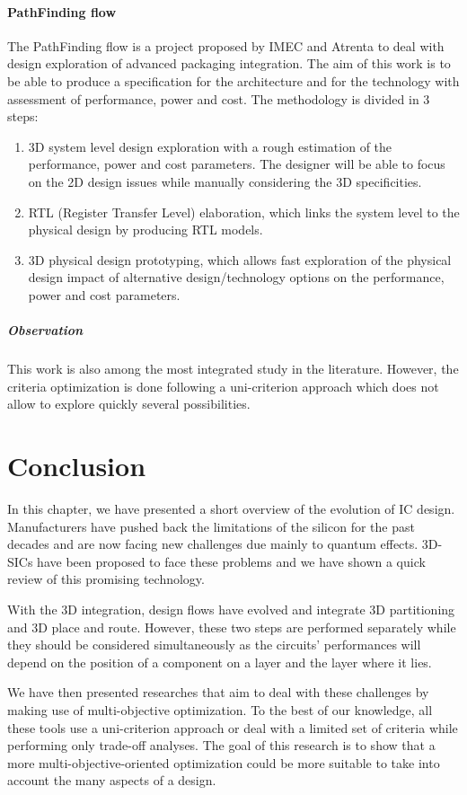 \paragraph{PathFinding flow}
The PathFinding flow is a project proposed by IMEC and Atrenta \cite{5335663,DBLP:conf/3dic/MilojevicCCRRSAPM09} to deal with design exploration of advanced packaging integration. The aim of this work is to be able to produce a specification for the architecture and for the technology with assessment of performance, power and cost. The methodology is divided in 3 steps:
\begin{enumerate}
\item 3D system level design exploration with a rough estimation of the performance, power and cost parameters. The designer will be able to focus on the 2D design issues while manually considering the 3D specificities.
\item RTL (Register Transfer Level) elaboration, which links the system level to the physical design by producing RTL models.
\item 3D physical design prototyping, which allows fast exploration of the physical design impact of alternative design/technology options on the performance, power and cost parameters.
\end{enumerate}

\subparagraph{Observation}
This work is also among the most integrated study in the literature. However, the criteria optimization is done following a uni-criterion approach which does not allow to explore quickly several possibilities.

\section{Conclusion}
In this chapter, we have presented a short overview of the evolution of IC design. Manufacturers have pushed back the limitations of the silicon for the past decades and are now facing new challenges due mainly to quantum effects. 3D-SICs have been proposed to face these problems and we have shown a quick review of this promising technology.

With the 3D integration, design flows have evolved and integrate 3D partitioning and 3D place and route. However, these two steps are performed separately while they should be considered simultaneously as the circuits' performances will depend on the position of a component on a layer and the layer where it lies.

We have then presented researches that aim to deal with these challenges by making use of multi-objective optimization. To the best of our knowledge, all these tools use a uni-criterion approach or deal with a limited set of criteria while performing only trade-off analyses. The goal of this research is to show that a more multi-objective-oriented optimization could be more suitable to take into account the many aspects of a design.


